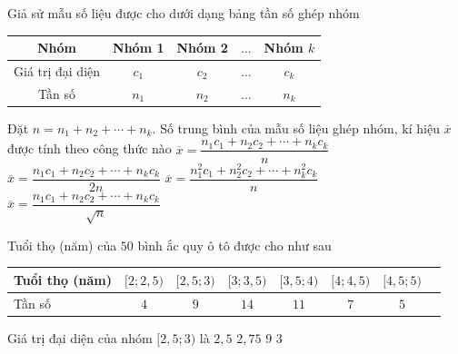 \begin{ex}%
	Giả sử mẫu số liệu được cho dưới dạng bảng  tần số ghép nhóm
	\begin{center}
		\begin{tabular}{|c|c|c|c|c|}
			 \hline
			Nhóm & Nhóm 1 &  Nhóm 2 & $\ldots$ & Nhóm $k$ \\
			 \hline
			 Giá trị đại diện & $c_1$ & $c_2$ & $\ldots$ & $c_k$ \\
			\hline 
			Tần số & $n_1$ & $n_2$ & $\ldots$ & $n_k$  \\
			\hline 
		\end{tabular}
	\end{center}
	Đặt $n=n_1+n_2+\cdots+n_k$. 
	Số trung bình của mẫu số liệu ghép  nhóm, kí hiệu $\overline{x}$ được tính theo công thức nào
	\choice 
		{\True  $\overline{x}=\dfrac{n_1 c_1+n_2 c_2+\cdots+n_k c_k}{n}$}
		{$\overline{x}=\dfrac{n_1 c_1+n_2 c_2+\cdots+n_k  c_k}{2n}$}
		 {$\overline{x}=\dfrac{n_1^2c_1+n_2^2c_2+\cdots+n_k^2c_k}{n}$}
		{$\overline{x}=\dfrac{n_1 c_1+n_2 c_2+\cdots+n_k c_k}{\sqrt{n}}$} 
\end{ex}

\begin{ex}%
	Tuổi thọ (năm) của $50$ bình ắc quy ô tô được cho như sau 
	\begin{center}
		\begin{tabular}{|l|c|c|c|c|c|c|c|}
			 \hline Tuổi thọ (năm) & {$[2;2{,}5)$} & {$ [2{,}5;3)$} & {$[3;3{,}5) $} & {$[3{,}5;4)$} & {$[4;4{,}5)$} & {$[4{,}5;5)$}\\
			\hline Tần số & $4$ &  $9$ & $14$ & $11$& $7$& $5$ \\
			 \hline
		\end{tabular}
	\end{center}
	Giá trị đại diện của nhóm  $[2,5;3)$ là
	\choice 
		 { $2{,}5$}
		{ \True  $2{,}75$}
		 { $9$}
		 { $3$}
	 \loigiai{
	 Giá trị đại diện của nhóm $[2{,}5;3)$ là $\dfrac{2{,}5+3}{2}=2{,}75$.}
\end{ex}


